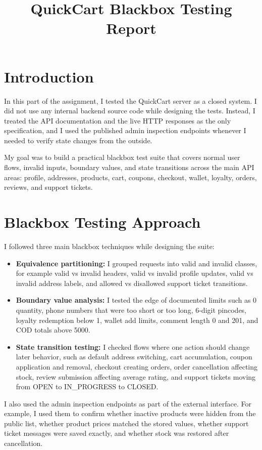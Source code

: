 \documentclass[12pt]{article}
\title{QuickCart Blackbox Testing Report}
\author{}
\date{}
\begin{document}
\maketitle

\section{Introduction}
In this part of the assignment, I tested the QuickCart server as a closed system. I did not use any internal backend source code while designing the tests. Instead, I treated the API documentation and the live HTTP responses as the only specification, and I used the published admin inspection endpoints whenever I needed to verify state changes from the outside.

My goal was to build a practical blackbox test suite that covers normal user flows, invalid inputs, boundary values, and state transitions across the main API areas: profile, addresses, products, cart, coupons, checkout, wallet, loyalty, orders, reviews, and support tickets.

\section{Blackbox Testing Approach}
I followed three main blackbox techniques while designing the suite:

\begin{itemize}
  \item \textbf{Equivalence partitioning:} I grouped requests into valid and invalid classes, for example valid vs invalid headers, valid vs invalid profile updates, valid vs invalid address labels, and allowed vs disallowed support ticket transitions.
  \item \textbf{Boundary value analysis:} I tested the edge of documented limits such as 0 quantity, phone numbers that were too short or too long, 6-digit pincodes, loyalty redemption below 1, wallet add limits, comment length 0 and 201, and COD totals above 5000.
  \item \textbf{State transition testing:} I checked flows where one action should change later behavior, such as default address switching, cart accumulation, coupon application and removal, checkout creating orders, order cancellation affecting stock, review submission affecting average rating, and support tickets moving from OPEN to IN\_PROGRESS to CLOSED.
\end{itemize}

I also used the admin inspection endpoints as part of the external interface. For example, I used them to confirm whether inactive products were hidden from the public list, whether product prices matched the stored values, whether support ticket messages were saved exactly, and whether stock was restored after cancellation.
\end{document}
